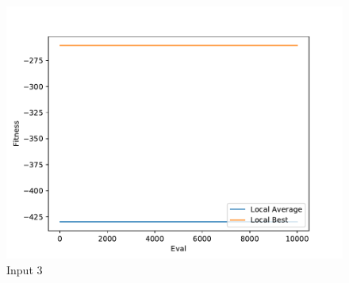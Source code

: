 \documentclass{standalone}
\begin{document}
\begin{figure}[!htb]
	\caption{Input 3}
	\label{fig:graph_3031}
	\includegraphics[width=\textwidth]{../graphs/graphs/3031.pdf}
\end{figure}
\end{document}
